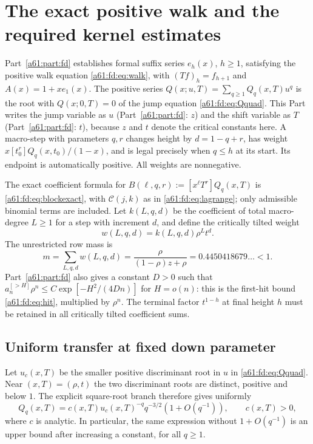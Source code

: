 \documentclass[11pt,letterpaper]{article}
\numberwithin{equation}{section}
\theoremstyle{remark}\newtheorem{remark}[theorem]{Remark}
\begin{document}
\section{The exact positive walk and the required kernel estimates}\label{a61:sh:sec:inputs}
Part~\ref{a61:part:fd} establishes formal suffix series $e_h(x)$, $h\ge1$, satisfying the positive walk equation \eqref{a61:fd:eq:walk}, with $(Tf)_h=f_{h+1}$ and $A(x)=1+xe_1(x)$. The positive series $Q(x;u,T)=\sum_{q\ge1}Q_q(x,T)u^q$ is the root with $Q(x;0,T)=0$ of the jump equation \eqref{a61:fd:eq:Qquad}. This Part writes the jump variable as $u$ (Part~\ref{a61:part:fd}: $z$) and the shift variable as $T$ (Part~\ref{a61:part:fd}: $t$), because $z$ and $t$ denote the critical constants here.
A macro-step with parameters $q,r$ changes height by $d=1-q+r$, has weight $x[t_0^r]Q_q(x,t_0)/(1-x)$, and is legal precisely when $q\le h$ at its start. Its endpoint is automatically positive. All weights are nonnegative.

The exact coefficient formula for $B(\ell,q,r):=[x^\ell T^r]Q_q(x,T)$ is \eqref{a61:fd:eq:blockexact}, with $\mathcal C(j,k)$ as in \eqref{a61:fd:eq:lagrange}; only admissible binomial terms are included. Let $k(L,q,d)$ be the coefficient of total macro-degree $L\ge1$ for a step with increment $d$, and define the critically tilted weight
\[
 w(L,q,d)=k(L,q,d)\rho^L t^d.
\]
The unrestricted row mass is
\begin{equation}\label{a61:sh:eq:mass}
 m=\sum_{L,q,d}w(L,q,d)=\frac{\rho}{(1-\rho)z+\rho}
 =0.4450418679\ldots<1.
\end{equation}
Part~\ref{a61:part:fd} also gives a constant $D>0$ such that $a_n^{[>H]}\rho^n\le C\exp[-H^2/(4Dn)]$ for $H=o(n)$: this is the first-hit bound \eqref{a61:fd:eq:hit}, multiplied by $\rho^n$.
The terminal factor $t^{1-h}$ at final height $h$ must be retained in all critically tilted coefficient sums.

\subsection{Uniform transfer at fixed down parameter}
Let $u_c(x,T)$ be the smaller positive discriminant root in $u$ in \eqref{a61:fd:eq:Qquad}. Near $(x,T)=(\rho,t)$ the two discriminant roots are distinct, positive and below $1$. The explicit square-root branch therefore gives uniformly
\[
 Q_q(x,T)=c(x,T)u_c(x,T)^{-q}q^{-3/2}(1+O(q^{-1})),
 \qquad c(x,T)>0,
\]
where $c$ is analytic. In particular, the same expression without $1+O(q^{-1})$ is an upper bound after increasing a constant, for all $q\ge1$.
\end{document}
